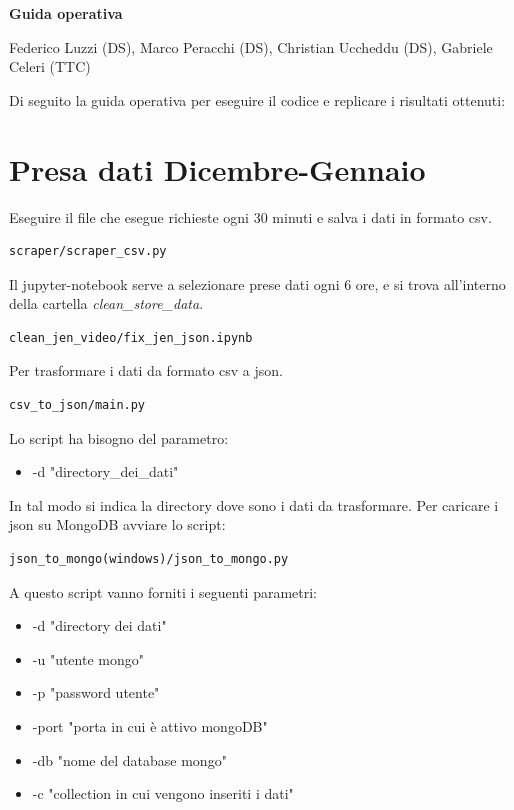\documentclass[10pt, a4paper,openany]{article}
\begin{document}
\begin{center}
{\Large\textbf{Guida operativa}}
\end{center}

\begin{center}
 Federico Luzzi (DS),  Marco Peracchi (DS), Christian Uccheddu (DS), Gabriele Celeri (TTC)
\end{center}
Di seguito la guida operativa per eseguire il codice e replicare i risultati ottenuti:

\section*{Presa dati Dicembre-Gennaio}

Eseguire il file che esegue richieste ogni 30 minuti e salva i dati in formato csv. 

\begin{verbatim}
scraper/scraper_csv.py
\end{verbatim}

Il jupyter-notebook serve a selezionare prese dati ogni 6 ore, e si trova all'interno della cartella \textit{clean\_store\_data}.

\begin{verbatim}
clean_jen_video/fix_jen_json.ipynb
\end{verbatim}

Per trasformare i dati da formato csv a json.

\begin{verbatim}
csv_to_json/main.py
\end{verbatim}

Lo script ha bisogno del parametro:

\begin{itemize}
	\item -d "directory\_dei\_dati"
\end{itemize}

In tal modo si indica la directory dove sono i dati da trasformare.
Per caricare i json su MongoDB avviare lo script:

\begin{verbatim}
json_to_mongo(windows)/json_to_mongo.py
\end{verbatim}

A questo script vanno forniti i seguenti parametri:

\begin{itemize}
	\item -d "directory dei dati"
	\item -u "utente mongo"
	\item -p "password utente"
	\item -port "porta in cui è attivo mongoDB"
	\item-db "nome del database mongo"
	\item -c "collection in cui vengono inseriti i dati"
\end{itemize}
\end{document}
